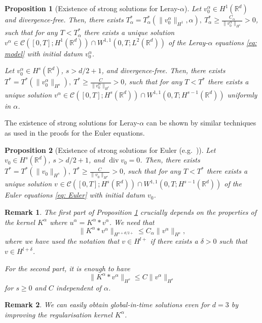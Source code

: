\documentclass{amsart}
\newtheorem{proposition}{Proposition}
\newtheorem{remark}{Remark}
\begin{document}
 
\begin{proposition}[Existence of strong solutions for Leray-$\alpha$] \label{thm:strong sol}
Let $v^{\alpha}_{0} \in H^1_{}(\mathbb{R}^d)$ and divergence-free. Then, there exists $T_{\alpha}^*=T_{\alpha}^*(\|v^{\alpha}_{0}\|_{H^1},\alpha), \ T_{\alpha}^*\geq \frac{C_{\alpha}}{\|v^{\alpha}_{0}\|_{H^1}}>0$, such that for any $T<T_{\alpha}^*$ there exists a unique solution $v^{\alpha} \in \mathcal{C}([0,T];H^1_{}(\mathbb{R}^d))\cap W^{1,1}(0,T;L^2_{}(\mathbb{R}^d))$ of the Leray-$\alpha$ equations \eqref{eq: model} with initial datum $v^{\alpha}_{0}$.

Let $v^{\alpha}_{0} \in H^s_{}(\mathbb{R}^d)$, $s>d/2+1$, and divergence-free. Then, there exists $T^*=T^*(\|v^{\alpha}_{0}\|_{H^s}), \ T^*\geq \frac{C}{\|v^{\alpha}_{0}\|_{H^s}}>0$, such that for any $T<T^*$ there exists a unique solution $v^{\alpha} \in \mathcal{C}([0,T];H^s_{}(\mathbb{R}^d)) \cap W^{1,1}(0,T;H^{s-1}_{}(\mathbb{R}^d))$ uniformly in $\alpha$.
 \end{proposition}
The existence of strong solutions for Leray-$\alpha$ can be shown by similar techniques as used in the proofs for the Euler equations.
\begin{proposition}[Existence of strong solutions for Euler (e.g.\ \cite{Bedrossian.2022, Kato.1972, Majda.2010})] \label{thm:strong sol Euler}
Let $v^{}_{0} \in H^s_{}(\mathbb{R}^d)$, $s>d/2+1$, and $\operatorname{div}v_0=0$. Then, there exists $T^*=T^*(\|v^{}_{0}\|_{H^s}), \ T^*\geq \frac{C}{\|v^{}_{0}\|_{H^s}}>0$, such that for any $T<T^*$ there exists a unique solution $v^{} \in \mathcal{C}([0,T];H^s_{}(\mathbb{R}^d)) \cap W^{1,1}(0,T;H^{s-1}_{}(\mathbb{R}^d))$ of the Euler equations \eqref{eq: Euler} with initial datum $v_0$.
\end{proposition}

 \begin{remark}
 \label{remark: assumptions u for unif existence}
The first part of Proposition \ref{thm:strong sol} crucially depends on the properties of the kernel $K^{\alpha}$ where $u^{\alpha}=K^{\alpha}*v^{\alpha}$. We need that
    $$ \|K^{\alpha}*v^{\alpha}\|_{H^{s+d/2+}} \leq C_{\alpha} \|v^{\alpha}\|_{H^s},$$
where we have used the notation that $v\in H^{l+}$ if there exists a $\delta>0$ such that $v\in H^{l+\delta}$.

For the second part, it is enough to have
$$ \|K^{\alpha}*v^{\alpha}\|_{H^s} \leq C \|v^{\alpha}\|_{H^s} $$
for $s\geq 0$ and $C$ independent of $\alpha$.
 \end{remark}
 \begin{remark}
 \label{remark: global in time unif sol}
We can easily obtain global-in-time solutions even for $d=3$ by improving the regularisation kernel $K^{\alpha}$.
\end{remark}
\end{document}

